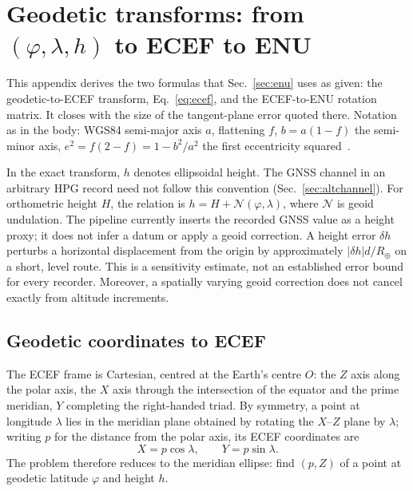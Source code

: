 \chapter{Geodetic transforms: from \texorpdfstring{$(\varphi,\lambda,h)$}{(phi, lambda, h)} to ECEF to ENU}
\label{app:geodesy}

\begin{revblock}
This appendix derives the two formulas that Sec.~\ref{sec:enu} uses as given: the
geodetic-to-ECEF transform, Eq.~\eqref{eq:ecef}, and the ECEF-to-ENU rotation matrix. It
closes with the size of the tangent-plane error quoted there. Notation as in the body:
WGS84 semi-major axis $a$, flattening $f$, $b=a(1-f)$ the semi-minor axis,
$e^2=f(2-f)=1-b^2/a^2$ the first eccentricity squared~\cite{nga_wgs84}.

In the exact transform, $h$ denotes ellipsoidal height. The GNSS channel in an
arbitrary HPG record need not follow this convention
(Sec.~\ref{sec:altchannel}). For orthometric height $H$, the relation is
$h=H+\mathcal N(\varphi,\lambda)$, where $\mathcal N$ is geoid undulation.
The pipeline currently inserts the recorded GNSS value as a height proxy;
it does not infer a datum or apply a geoid correction. A height error $\delta h$
perturbs a horizontal displacement from the origin by approximately
$|\delta h|d/R_\oplus$ on a short, level route. This is a sensitivity estimate,
not an established error bound for every recorder. Moreover, a spatially varying
geoid correction does not cancel exactly from altitude increments.

\section{Geodetic coordinates to ECEF}
\label{app:geodesy-ecef}

The ECEF frame is Cartesian, centred at the Earth's centre $O$: the $Z$ axis along the
polar axis, the $X$ axis through the intersection of the equator and the prime meridian,
$Y$ completing the right-handed triad. By symmetry, a point at longitude $\lambda$ lies in
the meridian plane obtained by rotating the $X$--$Z$ plane by $\lambda$; writing $p$ for
the distance from the polar axis, its ECEF coordinates are
\begin{equation}
\label{eq:geo-meridian}
X=p\cos\lambda,\qquad Y=p\sin\lambda.
\end{equation}
The problem therefore reduces to the meridian ellipse: find $(p,Z)$ of a point at geodetic
latitude $\varphi$ and height $h$.


\end{revblock}

